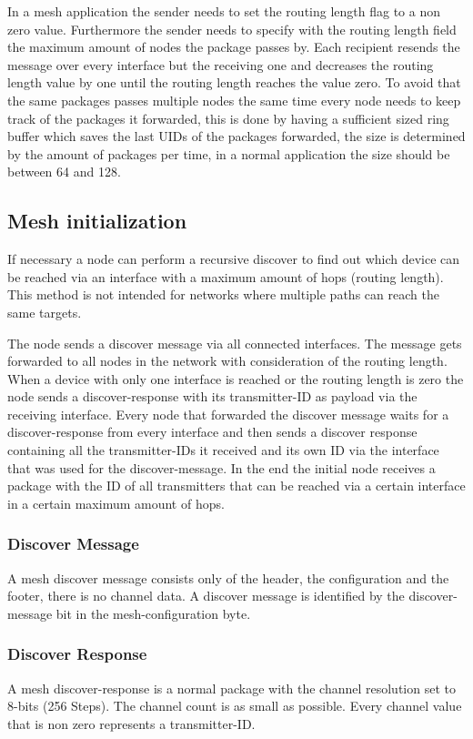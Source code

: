\documentclass{scrreprt}
\begin{document}
In a mesh application the sender needs to set the routing length flag to a non zero value.
Furthermore the sender needs to specify with the routing length field the maximum amount of
nodes the package passes by.
Each recipient resends the message over every interface but the receiving one and decreases the routing length value by one
until the routing length reaches the value zero. To avoid that the same
packages passes multiple nodes the same time every node
needs to keep track of the packages it forwarded, this is done by having a
sufficient sized ring buffer which saves the last UIDs of the packages forwarded,
the size is determined by the amount of packages per time, in a normal application
the size should be between 64 and 128.

\subsection{Mesh initialization}
If necessary a node can perform a recursive discover to find out which device can be reached via
an interface with a maximum amount of hops (routing length). This method is not intended for networks where multiple paths can reach the same
targets.

The node sends a discover message via all connected interfaces. The message gets forwarded to all
nodes in the network with consideration of the routing length. When a device with only one interface is reached or the routing length is zero the node sends a discover-response with its transmitter-ID as payload via the receiving interface. Every node that forwarded the discover message waits for a discover-response from every interface and then sends a discover response containing all the transmitter-IDs it received and its own ID via the interface that was used for the discover-message. In the end the initial node receives a package with the ID of all transmitters that can be reached via a certain interface in a certain maximum amount of hops.

\subsubsection{Discover Message}
A mesh discover message consists only of the header, the configuration and the footer, there is no
channel data. A discover message is identified by the discover-message bit in the mesh-configuration byte.

\subsubsection{Discover Response}
A mesh discover-response is a normal package with the channel resolution set to 8-bits (256 Steps). The channel count is as small as possible. Every channel value that is non zero represents
a transmitter-ID.
\end{document}

